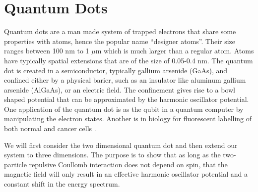 \section{Quantum Dots}
Quantum dots are a man made system of trapped electrons that share some properties with atoms, 
hence the popular name ``designer atoms''. Their size ranges between 100 nm to 1 $\mu$m which 
is much larger than a regular atom. Atoms have typically spatial extensions that are of the size of 
0.05-0.4 nm. The quantum dot is created in a semiconductor, typically gallium arsenide (GaAs), 
and confined either by a physical barier, such as an insulator like aluminum gallium arsenide (AlGaAs), 
or an electric field. The confinement gives rise to a bowl shaped potential that can be 
approximated by the harmonic oscillator potential. 
One application of the quantum dot is as the qubit in a quantum computer by manipulating the electron states. Another is in biology for fluorescent labelling of both normal and cancer cells .  
\newline

We will first consider the two dimensional quantum dot and then extend our system 
to three dimensions. The purpose is to show that as long as the two-particle repulsive Coullomb interaction does not depend on spin, that the magnetic field will only result in an 
effective harmonic oscillator potential and a constant shift in the energy spectrum. 

